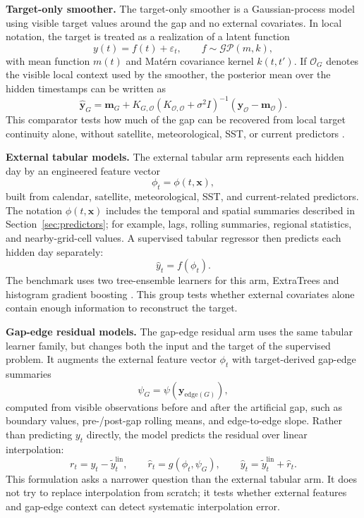 \textbf{Target-only smoother.}
The target-only smoother is a Gaussian-process model using visible target values around the gap
and no external covariates. In local notation, the target is treated as a realization of a latent
function
\[
    y(t) = f(t)+\varepsilon_t,
    \qquad
    f\sim\mathcal{GP}(m,k),
\]
with mean function $m(t)$ and Mat\'ern covariance kernel $k(t,t')$. If $\mathcal O_G$ denotes the
visible local context used by the smoother, the posterior mean over the hidden timestamps can be
written as
\[
    \hat{\mathbf y}_G
    =
    \mathbf m_G
    +
    K_{G,\mathcal O}
    \left(K_{\mathcal O,\mathcal O}+\sigma^2 I\right)^{-1}
    \left(\mathbf y_{\mathcal O}-\mathbf m_{\mathcal O}\right).
\]
This comparator tests how much of the gap can be recovered from local target continuity alone,
without satellite, meteorological, SST, or current predictors \citep{rasmussen2006gaussian}.
\vspace{0.25cm}

\textbf{External tabular models.}
The external tabular arm represents each hidden day by an engineered feature vector
\[
    \phi_t=\phi(t,\mathbf{x}),
\]
built from calendar, satellite, meteorological, SST, and current-related predictors. The notation
$\phi(t,\mathbf{x})$ includes the temporal and spatial summaries described in
Section~\ref{sec:predictors}; for example, lags, rolling summaries, regional statistics, and
nearby-grid-cell values. A supervised tabular regressor then predicts each hidden day separately:
\[
    \hat y_t = f(\phi_t).
\]
The benchmark uses two tree-ensemble learners for this arm, ExtraTrees and histogram gradient
boosting \citep{geurts2006extremely,friedman2001greedy,hastie2009elements}. This group tests
whether external covariates alone contain enough information to reconstruct the target.
\vspace{0.25cm}

\textbf{Gap-edge residual models.}
The gap-edge residual arm uses the same tabular learner family, but changes both the input and
the target of the supervised problem. It augments the external feature vector $\phi_t$ with
target-derived gap-edge summaries
\[
    \psi_G=\psi\!\left(\mathbf y_{\mathrm{edge}(G)}\right),
\]
computed from visible observations before and after the artificial gap, such as boundary values,
pre-/post-gap rolling means, and edge-to-edge slope. Rather than predicting $y_t$ directly, the
model predicts the residual over linear interpolation:
\[
    r_t = y_t-\tilde y_t^{\mathrm{lin}},
    \qquad
    \hat r_t = g(\phi_t,\psi_G),
    \qquad
    \hat y_t=\tilde y_t^{\mathrm{lin}}+\hat r_t .
\]
This formulation asks a narrower question than the external tabular arm. It does not try to
replace interpolation from scratch; it tests whether external features and gap-edge context can
detect systematic interpolation error.
\vspace{0.25cm}

